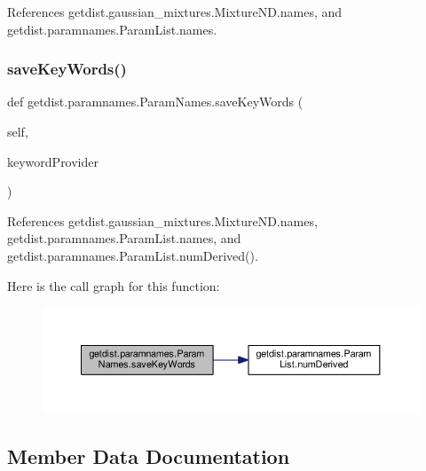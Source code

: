 References getdist.\+gaussian\+\_\+mixtures.\+Mixture\+N\+D.\+names, and getdist.\+paramnames.\+Param\+List.\+names.

\mbox{\label{classgetdist_1_1paramnames_1_1ParamNames_a6b7a69ffaaadb8fd4c853854ef025842}} 
\subsubsection{\texorpdfstring{save\+Key\+Words()}{saveKeyWords()}}
{\footnotesize\ttfamily def getdist.\+paramnames.\+Param\+Names.\+save\+Key\+Words (\begin{DoxyParamCaption}\item[{}]{self,  }\item[{}]{keyword\+Provider }\end{DoxyParamCaption})}



References getdist.\+gaussian\+\_\+mixtures.\+Mixture\+N\+D.\+names, getdist.\+paramnames.\+Param\+List.\+names, and getdist.\+paramnames.\+Param\+List.\+num\+Derived().

Here is the call graph for this function\+:
\nopagebreak
\begin{figure}[H]
\begin{center}
\leavevmode
\includegraphics[width=350pt]{classgetdist_1_1paramnames_1_1ParamNames_a6b7a69ffaaadb8fd4c853854ef025842_cgraph}
\end{center}
\end{figure}


\subsection{Member Data Documentation}
\mbox{\label{classgetdist_1_1paramnames_1_1ParamNames_a9b1371a13ae4e316ef8e4bb0ca6bdf8c}} 
